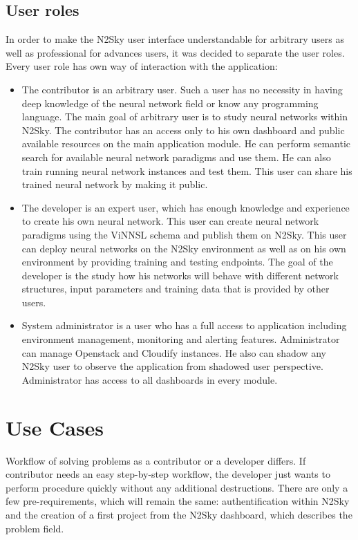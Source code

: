 \documentclass[conference]{IEEEtran}
\begin{document}
\subsection{User roles}

In order to make the N2Sky user interface understandable for arbitrary users as well as professional for advances users, it was decided to separate the user roles. Every user role has own way of interaction with the application:
\begin{itemize}
\item The contributor is an arbitrary user. Such a user has no necessity in having deep knowledge of the neural network field or know any programming language. The main goal of arbitrary user is to study neural networks within N2Sky. The contributor has an access only to his own dashboard and public available resources on the main application module. He can perform semantic search for available neural network paradigms and use them. He can also train running neural network instances and test them. This user can share his trained neural network by making it public. 
\item The developer is an expert user, which has enough knowledge and experience to create his own neural network. This user can create neural network paradigms using the ViNNSL schema and publish them on N2Sky. This user can deploy neural networks on the N2Sky environment as well as on his own environment by providing training and testing endpoints. The goal of the developer is the study how his networks will behave with different network structures, input parameters and training data that is provided by other users.
\item System administrator is a user who has a full access to application including environment management, monitoring and alerting features. Administrator can manage Openstack and Cloudify instances. He also can shadow any N2Sky user to observe the application from shadowed user perspective. Administrator has access to all dashboards in every module.
\end{itemize}


\section{Use Cases}

Workflow of solving problems as a contributor or a developer differs. If contributor needs an easy step-by-step workflow, the developer just wants to perform procedure quickly without any additional destructions. There are only a few pre-requirements, which will remain the same: authentification within N2Sky and the creation of a first project from the N2Sky dashboard, which describes the problem field.
\end{document}
